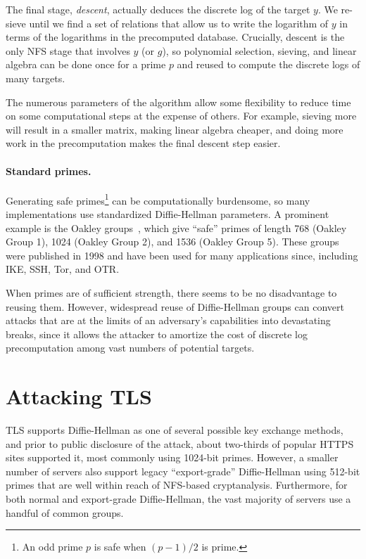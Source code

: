 The final stage, \emph{descent}, actually deduces the discrete log of the
target $y$. We re-sieve until we find a set of relations that allow us to
write the logarithm of $y$ in terms of the logarithms in the precomputed
database. Crucially, descent is the only NFS stage that involves $y$ (or
$g$), so polynomial selection, sieving, and linear algebra can be done once
for a prime $p$ and reused to compute the discrete logs of many targets.

The numerous parameters of the algorithm allow some flexibility to reduce
time on some computational steps at the expense of others. For example,
sieving more will result in a smaller matrix, making linear algebra cheaper,
and doing more work in the precomputation makes the final descent step
easier.

\paragraph{Standard primes.}
Generating safe primes\footnote{\small An odd prime $p$ is safe when
$(p-1)/2$ is prime.} can be computationally burdensome, so many
implementations use standardized Diffie-Hellman parameters. A prominent
example is the Oakley groups~\cite{rfc2412}, which give ``safe'' primes of
length 768 (Oakley Group 1), 1024 (Oakley Group 2), and 1536 (Oakley Group
5). These groups were published in 1998 and have been used for many
applications since, including IKE, SSH, Tor, and OTR\@.

When primes are of sufficient strength, there seems to be no
disadvantage to reusing them.  However, widespread reuse of
Diffie-Hellman groups can convert attacks that are at the limits of an
adversary's capabilities into devastating breaks, since it allows the
attacker to amortize the cost of discrete log precomputation among
vast numbers of potential targets.


\section{Attacking TLS}
\label{sec:tls}

TLS supports Diffie-Hellman as one of several possible key exchange
methods, and prior to public disclosure of the attack, about two-thirds of popular HTTPS sites supported it, most
commonly using 1024-bit primes.  However, a smaller number of servers
also support legacy ``export-grade'' Diffie-Hellman using 512-bit
primes that are well within reach of NFS-based
cryptanalysis. Furthermore, for both normal and export-grade
Diffie-Hellman, the vast majority of servers use a handful of common
groups.

